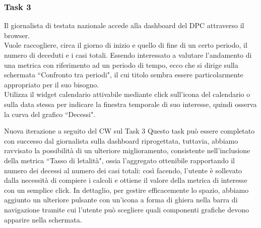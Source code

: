 \subsubsection{Task 3}
\label{sss:cw-task-3}

Il giornalista di testata nazionale accede alla dashboard del DPC attraverso il browser.\\
Vuole raccogliere, circa il giorno di inizio e quello di fine di un certo periodo, il numero di deceduti e i casi totali.
Essendo interessato a valutare l'andamento di una metrica con riferimento ad un periodo di tempo, ecco che si dirige sulla schermata ``Confronto tra periodi", il cui titolo sembra essere particolarmente appropriato per il suo bisogno.\\
Utilizza il widget calendario attivabile mediante click sull'icona del calendario o sulla data stessa per indicare la finestra temporale di suo interesse, quindi osserva la curva del grafico ``Decessi".

\begin{bclogo}{Nuova iterazione a seguito del CW sul Task 3}
    Questo task può essere completato con successo dal giornalista sulla dashboard riprogettata, tuttavia, abbiamo ravvisato la possibilità di un ulteriore miglioramento, consistente nell'inclusione della metrica ``Tasso di letalità", ossia l'aggregato ottenibile rapportando il numero dei decessi al numero dei casi totali: così facendo, l'utente è sollevato dalla necessità di compiere i calcoli e ottiene il valore della metrica di interesse con un semplice click.
    In dettaglio, per gestire efficacemente lo spazio, abbiamo aggiunto un ulteriore pulsante con un'icona a forma di ghiera nella barra di navigazione tramite cui l'utente può scegliere quali componenti grafiche devono apparire nella schermata.
\end{bclogo}